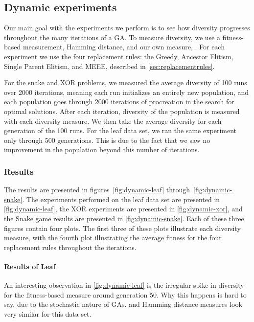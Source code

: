\subsection{Dynamic experiments}\label{sec:continuousdiversity}
Our main goal with the experiments we perform is to see how diversity progresses throughout the many iterations of a GA. To measure diversity, we use a fitness-based measurement, Hamming distance, and our own measure, \dia. For each experiment we use the four replacement rules: the Greedy, Ancestor Elitism, Single Parent Elitism, and MEEE, described in \cref{sec:replacementrules}.

For the snake and XOR problems, we measured the average diversity of \num{100} runs over \num{2000} iterations, meaning each run initializes an entirely new population, and each population goes through \num{2000} iterations of procreation in the search for optimal solutions. After each iteration, diversity of the population is measured with each diversity measure. We then take the average diversity for each generation of the \num{100} runs. For the leaf data set, we ran the same experiment only through \num{500} generations. This is due to the fact that we saw no improvement in the population beyond this number of iterations. 

\subsubsection{Results}
The results are presented in figures~\ref{fig:dynamic-leaf} through~\ref{fig:dynamic-snake}. The experiments performed on the leaf data set are presented in \cref{fig:dynamic-leaf}, the XOR experiments are presented in \cref{fig:dynamic-xor}, and the Snake game results are presented in \cref{fig:dynamic-snake}. Each of these three figures contain four plots. The first three of these plots illustrate each diversity measure, with the fourth plot illustrating the average fitness for the four replacement rules throughout the iterations. 

\paragraph{Results of Leaf} An interesting observation in \cref{fig:dynamic-leaf} is the irregular spike in diversity for the fitness-based measure around generation \num{50}. Why this happens is hard to say, due to the stochastic nature of GAs. \dia{} and Hamming distance measures look very similar for this data set. %

